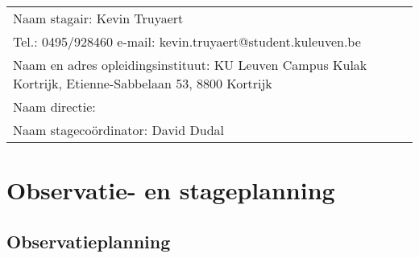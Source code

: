 
\begin{landscape}
	
	\begin{tabularx}{1.56\textwidth}{|X|}
		\hline
		Naam stagair:  Kevin Truyaert  \\
		Tel.: 0495/928460 \hspace{3cm} e-mail: kevin.truyaert@student.kuleuven.be  \\
		Naam en adres opleidingsinstituut:  KU Leuven Campus Kulak Kortrijk, Etienne-Sabbelaan 53, 8800 Kortrijk  \\
		Naam directie: \\
		Naam stagecoördinator:  David Dudal \\
		\hline
	\end{tabularx}
	\vspace*{-0.4cm}
\section{Observatie- en stageplanning}

\vspace*{-0.3cm}\subsection{Observatieplanning}

\end{landscape}
